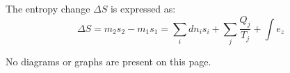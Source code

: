 The entropy change \( \Delta S \) is expressed as:  
\[
\Delta S = m_2 s_2 - m_1 s_1 = \sum_i dn_i s_i + \sum_j \frac{Q_j}{T_j} + \int e_z
\]  

No diagrams or graphs are present on this page.